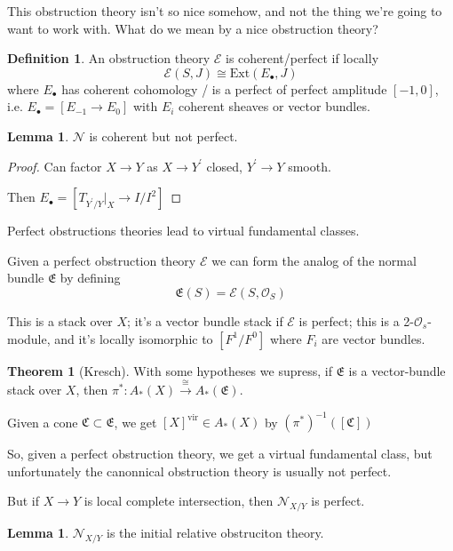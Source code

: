 \documentclass{amsart}
\theoremstyle{definition}
\newtheorem{theorem}[dummy]{Theorem}
\newtheorem{definition}[dummy]{Definition}
\newtheorem{lemma}[dummy]{Lemma}
\newcommand{\OO}{\mathcal{O}}
\newcommand{\vir}{\text{vir}}
\begin{document}
This obstruction theory isn't so nice somehow, and not the thing we're going to want to work with.  What do we mean by a nice obstruction theory?

\begin{definition}
An obstruction theory $\mathcal{E}$ is coherent/perfect if locally $$\mathcal{E}(S,J)\cong \text{Ext}(E_\bullet, J)$$
where $E_\bullet$ has coherent cohomology / is a perfect of perfect amplitude $[-1,0]$, i.e. $E_\bullet=[E_{-1}\to E_0]$ with $E_i$ coherent sheaves or vector bundles.

\end{definition}

\begin{lemma}
$\mathcal{N}$ is coherent but not perfect.
\end{lemma}

\begin{proof}

Can factor $X\to Y$ as $X\to Y^\prime$ closed, $Y^\prime\to Y$ smooth.

Then $E_\bullet=[T_{Y^\prime/Y}\big|_X\to I/I^2]$
\end{proof}

Perfect obstructions theories lead to virtual fundamental classes.

Given a perfect obstruction theory $\mathcal{E}$ we can form the analog of the normal bundle $\mathfrak{E}$ by defining $$\mathfrak{E}(S)=\mathcal{E}(S, \OO_S)$$

This is a stack over $X$; it's a vector bundle stack if $\mathcal{E}$ is perfect; this is a 2-$\OO_s$-module, and it's locally isomorphic to $[F^1/F^0]$ where $F_i$ are vector bundles.

\begin{theorem}[Kresch]
With some hypotheses we supress, if $\mathfrak{E}$ is a vector-bundle stack over $X$, then $\pi^*:A_*(X)\stackrel{\cong}\to A_*(\mathfrak{E})$.
\end{theorem}

Given a cone $\mathfrak{C}\subset\mathfrak{E}$, we get $[X]^\vir\in A_*(X)$ by $(\pi^*)^{-1}([\mathfrak{C}])$

So, given a perfect obstruction theory, we get a virtual fundamental class, but unfortunately the canonnical obstruction theory is usually not perfect.

But if $X\to Y$ is local complete intersection, then $\mathcal{N}_{X/Y}$ is perfect.

\begin{lemma}
$\mathcal{N}_{X/Y}$ is the initial relative obstruciton theory.
\end{lemma}
\end{document}
